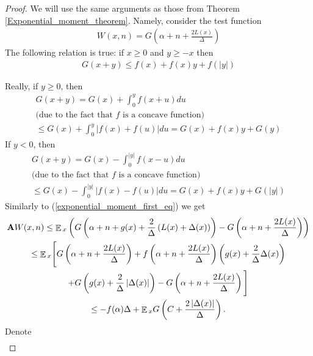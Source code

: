 \documentclass[10pt, reqno]{amsart}
\theoremstyle{definition}
\newcommand{\gtfVar}{G} %
\newcommand{\wtfVar}{W} %
\newcommand{\atoVar}{\mathbf{A}} %
\newcommand{\ltfVar}{L} %
\newcommand{\gdfVar}{f} %
\newcommand{\absolute}[1]{\left|#1\right|}
\DeclareMathOperator*{\E}{\mathbb{E}}
\begin{document}
	\begin{proof}
		We will use the same arguments as those from Theorem \ref{Exponential_moment_theorem}. Namely, consider the test function
		\begin{gather*}
		\wtfVar(x, n) = \gtfVar\left(\alpha + n + \frac{2\ltfVar(x)}{\Delta}\right)
		\end{gather*}
		The following relation is true: if $x \geq 0$ and $y \geq -x$ then
		\begin{gather*}
		\gtfVar(x + y) \leq \gdfVar(x) + \gdfVar(x)y + \gdfVar(\absolute{y})
		\end{gather*}
		
		Really, if $y \geq 0$, then
		\begin{gather*}
		\gtfVar(x + y) = \gtfVar(x) + \int_{0}^{y}\gdfVar(x + u)du \\ \text{(due to the fact that $\gdfVar$ is a concave function)} \\ \leq \gtfVar(x) + \int_{0}^{y}\absolute{\gdfVar(x) + \gdfVar(u)}du = \gtfVar(x) + \gdfVar(x)y + \gtfVar(y)
		\end{gather*}
		If $y < 0$, then
		\begin{gather*}
		\gtfVar(x + y) = \gtfVar(x) - \int_{0}^{\absolute{y}}\gdfVar(x - u)du \\ \text{(due to the fact that $\gdfVar$ is a concave function)} \\ \leq \gtfVar(x) - \int_{0}^{\absolute{y}}\absolute{\gdfVar(x) - \gdfVar(u)}du = \gtfVar(x) + \gdfVar(x)y + \gtfVar(\absolute{y})
		\end{gather*}
		Similarly to (\ref{exponential_moment_first_eq}) we get
		\begin{gather*}
		\atoVar\wtfVar(x, n) \leq \E{}_{x}\left(\gtfVar\left(\alpha + n + \gffVar(x) + \frac{2}{\Delta}\left(\ltfVar(x) + \Delta(x)\right)\right) - \gtfVar\left(\alpha + n + \frac{2\ltfVar(x)}{\Delta}\right)\right) \\ \leq \E{}_{x}\Bigg[\gtfVar\left(\alpha + n + \frac{2\ltfVar(x)}{\Delta}\right) + \gdfVar\left(\alpha + n + \frac{2\ltfVar(x)}{\Delta}\right)\left(\gffVar(x) + \frac{2}{\Delta}\Delta(x)\right) \\ + \gtfVar\left(\gffVar(x) + \frac{2}{\Delta}\absolute{\Delta(x)}\right) - \gtfVar\left(\alpha + n + \frac{2\ltfVar(x)}{\Delta}\right)\Bigg] \\ \leq -\gdfVar(\alpha)\Delta + \E{}_{x}\gtfVar\left(C + \frac{2\absolute{\Delta(x)}}{\Delta}\right).
		\end{gather*}
		Denote
		\begin{gather}

\end{gather}
\end{proof}
\end{document}
